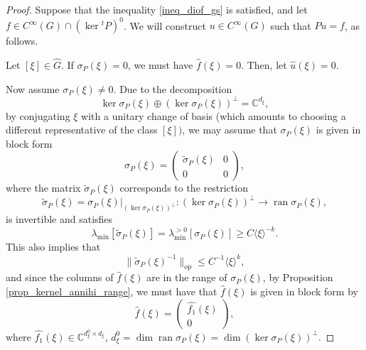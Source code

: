 \documentclass[10pt,a4paper]{amsart}
\newcommand{\C}{\mathbb{C}}
\begin{document}
\begin{proof}
Suppose that the inequality \eqref{ineq_diof_gs} is satisfied, and let $f\in C^\infty(G)\cap (\ker {}^tP)^0$.  We will construct $u\in C^\infty(G)$ such that $Pu=f$, as follows.

Let $[\xi]\in\widehat{G}$. If $\sigma_P(\xi)=0$, we must have $\widehat{f}(\xi)=0$. Then, let $\widehat{u}(\xi)=0$. 

Now assume $\sigma_P(\xi)\neq 0$. Due to the decomposition 
\begin{equation*}
    \ker \sigma_P(\xi)\oplus( \ker \sigma_P(\xi))^\perp=\C^{d_\xi},
\end{equation*}
by conjugating $\xi$ with a unitary change of basis (which amounts to choosing a different representative of the class $[\xi])$, we may assume that $\sigma_P(\xi)$ is given in block form
\begin{equation*}
    \sigma_P(\xi)=\begin{pmatrix}
        \tilde \sigma_P(\xi)&0\\
        0&0
    \end{pmatrix},
\end{equation*}
where the matrix $\tilde \sigma_P(\xi)$ corresponds to the restriction
\begin{equation*}
    \tilde \sigma_P(\xi)= \sigma_P(\xi)|_{(\ker \sigma_P(\xi))^\perp}:(\ker \sigma_P(\xi))^\perp\to \operatorname{ran}\sigma_P(\xi),
\end{equation*}
is invertible and satisfies
\begin{equation*}
     \lambda_{\min}[\tilde\sigma_P(\xi)]= \lambda_{\min}^{>0}[\sigma_P(\xi)]\geq C\langle \xi \rangle^{-k}.
\end{equation*}
This also implies that 
\begin{equation*}
    \| \tilde \sigma_P(\xi)^{-1}\|_{\operatorname{op}}\leq C^{-1}\langle \xi \rangle^{k},
\end{equation*}
and since the columns of $\widehat{f}(\xi)$ are in the range of $\sigma_P(\xi)$, by Proposition \ref{prop_kernel_annihi_range}, we must have that $\widehat{f}(\xi)$ is given in block form by
\begin{equation*}
    \widehat{f}(\xi)= \begin{pmatrix}
        {\widehat{f_1}}(\xi)\\0
    \end{pmatrix},
\end{equation*}
where $\widehat{f_1}(\xi)\in\C^{d^0_\xi\times d_\xi}$, $d^0_\xi = \dim \operatorname{ran}\sigma_P(\xi)=\dim (\ker \sigma_P(\xi))^{\perp}$.


\end{proof}
\end{document}
